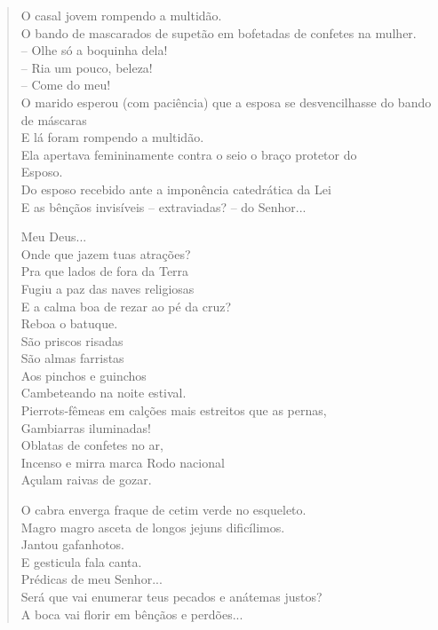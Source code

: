 \begin{verse}
O casal jovem rompendo a multidão.\\
O bando de mascarados de supetão em bofetadas de confetes na mulher.\\
-- Olhe só a boquinha dela!\\
-- Ria um pouco, beleza!\\
-- Come do meu!\\
O marido esperou (com paciência) que a esposa se desvencilhasse do bando de máscaras\\
E lá foram rompendo a multidão.\\
Ela apertava femininamente contra o seio o braço protetor do\\
Esposo.\\
Do esposo recebido ante a imponência catedrática da Lei\\
E as bênçãos invisíveis -- extraviadas? -- do Senhor...

Meu Deus...\\
Onde que jazem tuas atrações?\\
Pra que lados de fora da Terra\\
Fugiu a paz das naves religiosas\\
E a calma boa de rezar ao pé da cruz?\\
Reboa o batuque.\\
São priscos risadas\\
São almas farristas\\
Aos pinchos e guinchos\\
Cambeteando na noite estival.\\
Pierrots-fêmeas em calções mais estreitos que as pernas,\\
\quad{}Gambiarras iluminadas!\\
Oblatas de confetes no ar,\\
Incenso e mirra marca Rodo nacional\\
Açulam raivas de gozar.

O cabra enverga fraque de cetim verde no esqueleto.\\
Magro magro asceta de longos jejuns dificílimos.\\
Jantou gafanhotos.\\
E gesticula fala canta.\\
Prédicas de meu Senhor...\\
Será que vai enumerar teus pecados e anátemas justos?\\
A boca vai florir em bênçãos e perdões...


\end{verse}
